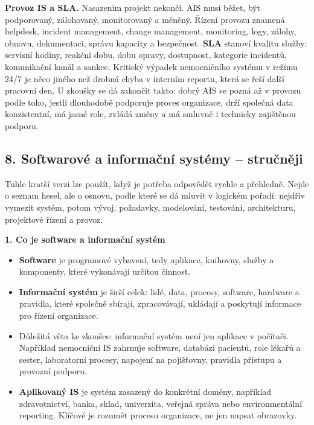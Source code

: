 \documentclass[11pt,a4paper]{article}
\begin{document}
\begin{greenbox}
\textbf{Provoz IS a SLA.} Nasazením projekt nekončí. AIS musí běžet, být podporovaný, zálohovaný, monitorovaný a měněný. Řízení provozu znamená helpdesk, incident management, change management, monitoring, logy, zálohy, obnovu, dokumentaci, správu kapacity a bezpečnost. \textbf{SLA} stanoví kvalitu služby: servisní hodiny, reakční dobu, dobu opravy, dostupnost, kategorie incidentů, komunikační kanál a sankce. Kritický výpadek nemocničního systému v režimu 24/7 je něco jiného než drobná chyba v interním reportu, která se řeší další pracovní den. U zkoušky se dá zakončit takto: dobrý AIS se pozná až v provozu podle toho, jestli dlouhodobě podporuje proces organizace, drží společná data konzistentní, má jasné role, zvládá změny a má smluvně i technicky zajištěnou podporu.
\end{greenbox}

\subsection*{8. Softwarové a informační systémy -- stručněji}
Tuhle kratší verzi lze použít, když je potřeba odpovědět rychle a přehledně. Nejde o seznam hesel, ale o osnovu, podle které se dá mluvit v logickém pořadí: nejdřív vymezit systém, potom vývoj, požadavky, modelování, testování, architekturu, projektové řízení a provoz.

\textbf{1. Co je software a informační systém}
\begin{itemize}
  \item \textbf{Software} je programové vybavení, tedy aplikace, knihovny, služby a komponenty, které vykonávají určitou činnost.
  \item \textbf{Informační systém} je širší celek: lidé, data, procesy, software, hardware a pravidla, které společně sbírají, zpracovávají, ukládají a poskytují informace pro řízení organizace.
  \item Důležitá věta ke zkoušce: informační systém není jen aplikace v počítači. Například nemocniční IS zahrnuje software, databázi pacientů, role lékařů a sester, laboratorní procesy, napojení na pojišťovny, pravidla přístupu a provozní podporu.
  \item \textbf{Aplikovaný IS} je systém zasazený do konkrétní domény, například zdravotnictví, banka, sklad, univerzita, veřejná správa nebo environmentální reporting. Klíčové je rozumět procesu organizace, ne jen napsat obrazovky.
\end{itemize}
\end{document}
